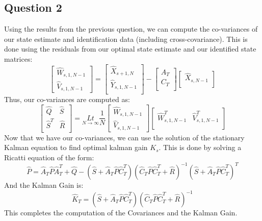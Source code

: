 \documentclass[12pt]{report}
\begin{document}
\subsection*{Question 2}
Using the results from the previous question, we can compute the co-variances of our state estimate and identification data (including cross-covariance). This is done using the residuals from our optimal state estimate and our identified state matrices:\\
\begin{equation*}
\begin{bmatrix}
\hat{W}_{s,1,N-1}\\
\hat{V}_{s,1,N-1}
\end{bmatrix}
=
\begin{bmatrix}
\hat{X}_{s+1,N}\\
\hat{Y}_{s,1,N-1}\\
\end{bmatrix}
- \begin{bmatrix}
A_T\\
C_T\\
\end{bmatrix}
\begin{bmatrix}
\hat{X}_{s,N-1}\\
\end{bmatrix}
\end{equation*}
Thus, our co-variances are computed as:\\
\begin{equation*}
\begin{bmatrix}
\hat{Q} & \hat{S}\\
\hat{S}^T & \hat{R}\\
\end{bmatrix}
=\underset{N\rightarrow \infty}{Lt}\frac{1}{N}
\begin{bmatrix}
\hat{W}_{s,1,N-1}\\
\hat{V}_{s,1,N-1}
\end{bmatrix}
\begin{bmatrix}
\hat{W}_{s,1,N-1}^T & \hat{V}_{s,1,N-1}^T\\
\end{bmatrix}
\end{equation*}
Now that we have our co-variances, we can use the solution of the stationary Kalman equation to find optimal kalman gain $K_s$. This is done by solving a Ricatti equation of the form:\\
\begin{equation*}
\hat{P} = \hat{A}_T\hat{P}\hat{A}_T^T + \hat{Q} - (\hat{S} + \hat{A}_T\hat{P}\hat{C}_T^T)(\hat{C}_T\hat{P}\hat{C}_T^T + \hat{R})^{-1}(\hat{S} + \hat{A}_T\hat{P}\hat{C}_T^T)^T
\end{equation*}
And the Kalman Gain is:\\
\begin{equation*}
\hat{K}_T = (\hat{S} + \hat{A}_T\hat{P}\hat{C}_T^T)(\hat{C}_T\hat{P}\hat{C}_T^T + \hat{R})^{-1}
\end{equation*}
This completes the computation of the Covariances and the Kalman Gain.
\end{document}
